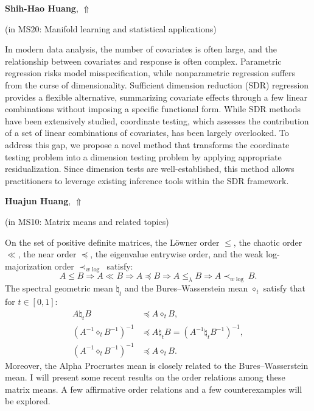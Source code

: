 \documentclass[ILAS2025-program.tex]{subfiles}
\begin{document}
\hypertarget{down0040}{}\begin{ilasabstract}
    
\textbf{Shih-Hao Huang},  \hfill \hyperlink{up0040}{$\Uparrow$}
    
    
(in {\color{mstitle}MS20: Manifold learning and statistical applications})
        
\mtskip
    In modern data analysis, the number of covariates is often large, and the relationship between covariates and response is often complex. Parametric regression risks model misspecification, while nonparametric regression suffers from the curse of dimensionality. Sufficient dimension reduction (SDR) regression provides a flexible alternative, summarizing covariate effects through a few linear combinations without imposing a specific functional form. While SDR methods have been extensively studied, coordinate testing, which assesses the contribution of a set of linear combinations of covariates, has been largely overlooked. To address this gap, we propose a novel method that transforms the coordinate testing problem into a dimension testing problem by applying appropriate residualization. Since dimension tests are well-established, this method allows practitioners to leverage existing inference tools within the SDR framework.

\end{ilasabstract}
    

\hypertarget{down0133}{}\begin{ilasabstract}
    
\textbf{Huajun Huang},  \hfill \hyperlink{up0133}{$\Uparrow$}
    
    
(in {\color{mstitle}MS10: Matrix means and related topics})
        
\mtskip
    On the set  of positive definite matrices, 
the L\"owner order \(\le\), the chaotic order \(\ll\), the near order \(\preceq\), the eigenvalue entrywise order, and the weak log-majorization order \(\prec_{w \log}\) satisfy:
\[
A \le B \Longrightarrow A \ll B  \Longrightarrow  A \preceq B  \Longrightarrow A \le_{\lambda} B \Longrightarrow A \prec_{w \log} B.
\]
The spectral geometric mean \(\natural_t\) and the Bures–Wasserstein mean \(\diamond_t\) satisfy that for \(t \in [0,1]\):
\begin{align*}
	A \natural_t B &\preceq A \diamond_t B, \\
	(A^{-1} \diamond_t B^{-1})^{-1} &\preceq A \natural_t B = (A^{-1} \natural_t B^{-1})^{-1}, \\
	(A^{-1} \diamond_t B^{-1})^{-1} &\preceq A \diamond_t B.
\end{align*}
Moreover, the Alpha Procrustes mean is closely related to the Bures–Wasserstein mean. 
I will present some recent results on the order relations among these matrix means. A few affirmative order relations and a few counterexamples will be explored.
\end{ilasabstract}
    
\end{document}
